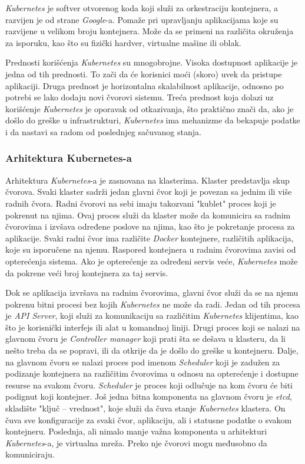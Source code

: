 \textit{Kubernetes} je softver otvorenog koda koji služi za orkestraciju kontejnera, a razvijen je od 
strane \textit{Google}-a. Pomaže pri upravljanju aplikacijama koje su razvijene u velikom broju 
kontejnera. Može da se primeni na različita okruženja za isporuku, kao što su fizički 
hardver, virtualne mašine ili oblak.

Prednosti korišćenja \textit{Kubernetes} su mnogobrojne. Visoka dostupnost aplikacije je jedna od tih prednosti. 
To zači da će korisnici moći (skoro) uvek da pristupe aplikaciji. Druga prednost je horizontalna 
skalabilnost aplikacije, odnosno po potrebi se lako dodaju novi čvorovi sistemu. Treća prednost koja 
dolazi uz korišćenje \textit{Kubernetes} je oporavak od otkazivanja, što praktično znači da, ako je došlo do 
greške u infrastrukturi, \textit{Kubernetes} ima mehanizme da bekapuje podatke i da nastavi sa radom od 
poslednjeg sačuvanog stanja.

\subsubsection{Arhitektura Kubernetes-a}
Arhitektura \textit{Kubernetes}-a je zasnovana na klasterima. Klaster predstavlja skup čvorova. Svaki klaster sadrži
jedan glavni čvor koji je povezan sa jednim ili više radnih čvora. Radni čvorovi na sebi imaju 
takozvani "kublet" proces koji je pokrenut na njima. Ovaj proces služi da klaster može da komunicira
sa radnim čvorovima i izvšava određene poslove na njima, kao što je pokretanje procesa za aplikacije.
Svaki radni čvor ima različite \textit{Docker} kontejnere, različitih aplikacija, koje su isporučene na njemu.
Raspored kontejnera u radnim čvorovima zavisi od opterećenja sistema. Ako je opterećenje za određeni 
servis veće, \textit{Kubernetes} može da pokrene veći broj kontejnera za taj servis. 

Dok se aplikacija izvršava na radnim čvorovima, glavni čvor služi da se na njemu pokrenu bitni procesi 
bez kojih \textit{Kubernetes} ne može da radi. Jedan od tih procesa je {\em API Server}, koji služi za 
komunikaciju sa različitim \textit{Kubernetes} klijentima, kao što je korisnički interfejs ili alat u 
komandnoj liniji. Drugi proces koji se nalazi na glavnom čvoru je {\em Controller manager} koji 
prati šta se dešava u klasteru, da li nešto treba da se popravi, ili da otkrije da je došlo do greške 
u kontejneru. Dalje, na glavnom čvoru se nalazi proces pod imenom {\em Scheduler} koji je zadužen 
za podizanje kontejnera na različitim čvorovima u odnosu na opterećenje i dostupne resurse na svakom 
čvoru. \textit{Scheduler} je proces koji odlučuje na kom čvoru će biti podignut koji kontejner. 
Još jedna bitna komponenta na glavnom čvoru je {\em etcd}, skladište "ključ -- vrednost", koje služi 
da čuva stanje \textit{Kubernetes} klastera. On čuva sve konfiguracije za svaki čvor, aplikaciju, ali i statusne 
podatke o svakom kontejneru. Poslednja, ali nimalo manje važna komponenta u arhitekturi \textit{Kubernetes}-a, 
je virtualna mreža. Preko nje čvorovi mogu međusobno da komuniciraju. 


